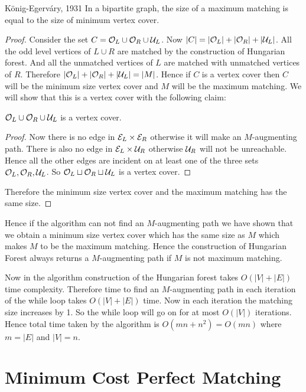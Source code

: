\documentclass[twoside]{article}
\begin{document}
\begin{Theorem}{K\"{o}nig-Egerv\'{a}ry, 1931}{}
	In a bipartite graph, the size of a maximum matching is equal to the size of minimum vertex cover.
\end{Theorem}
\begin{proof}
	Consider the set $C=\mathcal{O}_L\cup \mathcal{O}_R\cup \mathcal{U}_L$. Now $|C|=|\mathcal{O}_L|+|\mathcal{O}_R|+|\mathcal{U}_L|$. All the odd level vertices of $L\cup R$ are matched by the construction of Hungarian forest. And all the unmatched vertices of $L$ are matched with unmatched vertices of $R$. Therefore $|\mathcal{O}_L|+|\mathcal{O}_R|+|\mathcal{U}_L|=|M|$. Hence if $C$ is a vertex cover then $C$ will be the minimum size vertex cover and $M$ will be the maximum matching. We will show that this is a vertex cover with the following claim:
	\begin{claimwidth}
		\begin{claim}{}{}
			$\mathcal{O}_L\cup \mathcal{O}_R\cup \mathcal{U}_L$ is a vertex cover.
		\end{claim}
		\begin{proof}
			Now there is no edge in $\mathcal{E}_L\times \mathcal{E}_R$ otherwise it will make an $M$-augmenting path. There is also no edge in $\mathcal{E}_L\times \mathcal{U}_R$  otherwise $\mathcal{U}_R$ will not be unreachable. Hence all the other edges are incident on at least  one of the three sets $\mathcal{O}_L,\mathcal{O}_R,\mathcal{U}_L$. So $\mathcal{O}_L\sqcup \mathcal{O}_R\sqcup \mathcal{U}_L$ is a vertex cover. 
		\end{proof}
	\end{claimwidth}
	Therefore the minimum size vertex cover and the maximum matching has the same size.
\end{proof}

Hence if the algorithm can not find an $M$-augmenting path we have shown that we obtain a  minimum size vertex cover which has the same size as $M$ which makes $M$ to be the maximum matching. Hence the construction of Hungarian Forest always returns a $M$-augmenting path if $M$ is not maximum matching.

Now in the algorithm construction of the Hungarian forest takes $O(|V|+|E|)$ time complexity. Therefore time to find an $M$-augmenting path in each iteration of the while loop takes $O(|V|+|E|)$ time. Now in each iteration the matching size increases by 1. So the while loop will go on for at most $O(|V|)$ iterations. Hence total time taken by the algorithm is $O(mn+n^2)=O(mn)$ where $m=|E|$ and  $|V|=n$.

\section{Minimum Cost Perfect Matching}
\begin{algoprob}
\end{algoprob}
\end{document}
